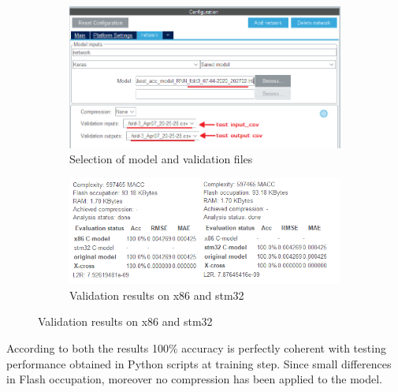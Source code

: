 \begin{center}
	\begin{figure}[H]
		\begin{subfigure}[H]{0.45\textwidth}
			\hfill\includegraphics[scale=0.55]{figures/validation_gui.png}\vspace*{\fill}
			\caption{Selection of model and validation files}
		\end{subfigure}
	\hfill
		\begin{subfigure}[H]{0.45\textwidth}
			\hfill\includegraphics[scale=0.7]{figures/x86_stm32_validation.png}\vspace*{\fill}
			\caption{Validation results on x86 and stm32}
		\end{subfigure}
	\end{figure}
\end{center}
According to both the results 100\% accuracy is perfectly coherent with testing performance obtained in Python scripts at training step. Since small differences in Flash occupation, moreover no compression has been applied to the model.







